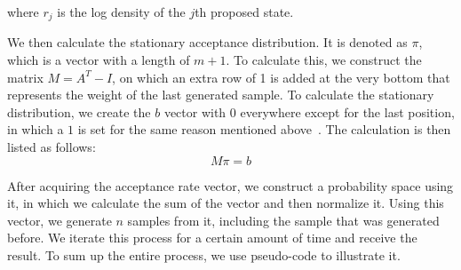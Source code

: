 where $r_j$ is the log density of the $j$th proposed state.

We then calculate the stationary acceptance distribution. It is denoted as $\pi$, which is a vector with a length of $m+1$. To calculate this, we construct the matrix $M = A^T - I$, on which an extra row of 1 is added at the very bottom that represents the weight of the last generated sample. To calculate the stationary distribution, we create the $b$ vector with $0$ everywhere except for the last position, in which a $1$ is set for the same reason mentioned above~\cite{gpmh_derivation}. The calculation is then listed as follows:
\begin{equation}
M\pi = b
\end{equation}

After acquiring the acceptance rate vector, we construct a probability space using it, in which we calculate the sum of the vector and then normalize it. Using this vector, we generate $n$ samples from it, including the sample that was generated before. We iterate this process for a certain amount of time and receive the result. To sum up the entire process, we use pseudo-code to illustrate it.
\\



